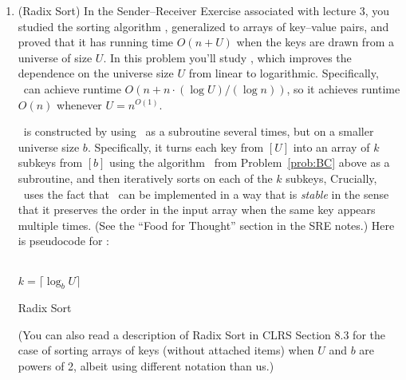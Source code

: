 \documentclass[11pt]{article}
\begin{document}
\begin{enumerate}
\begin{enumerate}
\end{enumerate}
\newpage

\item (Radix Sort) In the Sender--Receiver Exercise associated with lecture 3, you studied the sorting algorithm \SingletonBucketSort, generalized to arrays of key--value pairs, and proved that it has running time $O(n+U)$ when the keys are drawn from a universe of size $U$. In this problem you'll study {\em \RadixSort}, which improves the dependence on the universe size $U$ from linear to logarithmic.  Specifically, \RadixSort\ can achieve runtime $O(n+n\cdot (\log U)/(\log n))$, so it achieves runtime $O(n)$ whenever $U = n^{O(1)}$.  

\RadixSort\ is constructed by using \SingletonBucketSort\ as a subroutine several times, but on a smaller universe size $b$.  Specifically, it turns each key from $[U]$ into an array of $k$ subkeys from $[b]$ using the algorithm \BC\ from Problem~\ref{prob:BC} above as a subroutine, and then iteratively sorts on each of the $k$ subkeys,
Crucially, \RadixSort\ uses the fact that \SingletonBucketSort\ can be implemented in a way that is {\em stable} in the sense that it preserves the order in the input array when the same key appears multiple times.  (See the ``Food for Thought'' section in the SRE notes.)  Here is pseudocode for \RadixSort:


\begin{algorithm}[H]
\\
$k=\lceil \log_b U\rceil$\;
\caption{Radix Sort}
\end{algorithm}

(You can also read a description of Radix Sort in CLRS Section 8.3 for the case of sorting arrays of keys (without attached items) when $U$ and $b$ are powers of 2, albeit using different notation than us.)


\end{enumerate}
\end{document}
